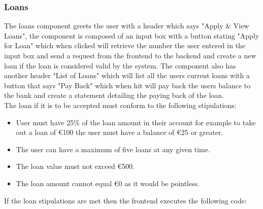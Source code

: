 \subsubsection{Loans}
The loans component greets the user with a header which says "Apply \& View Loans", the component is composed of
an input box with a button stating "Apply for Loan" which when clicked will retrieve the number the user entered
in the input box and send a request from the frontend to the backend and create a new loan if the loan is considered
valid by the system.  The component also has another header "List of Loans" which will list all the users current loans
with a button that says "Pay Back" which when hit will pay back the users balance to the bank and create a statement detailing
the paying back of the loan.
\\
The loan if it is to be accepted must conform to the following stipulations:
\begin{itemize}
  \item User must have 25\% of the loan amount in their account for example to take out a loan of €100 the user must have a balance of €25 or greater.
  \item The user can have a maximum of five loans at any given time.
  \item The loan value must not exceed €500.
  \item The loan amount cannot equal €0 as it would be pointless.
\end{itemize}
If the loan stipulations are met then the frontend executes the following code:
